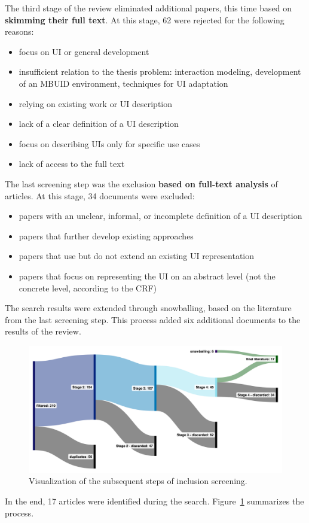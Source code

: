 The third stage of the review eliminated additional papers, this time based on \textbf{skimming their full text}.
At this stage, 62 were rejected for the following reasons:
\begin{itemize}
    \item focus on UI or general development
    \item insufficient relation to the thesis problem: interaction modeling, development of an MBUID environment, techniques for UI adaptation
    \item relying on existing work or UI description
    \item lack of a clear definition of a UI description
    \item focus on describing UIs only for specific use cases
    \item lack of access to the full text
\end{itemize}

The last screening step was the exclusion \textbf{based on full-text analysis} of articles.
At this stage, 34 documents were excluded:
\begin{itemize}
    \item papers with an unclear, informal, or incomplete definition of a UI description
    \item papers that further develop existing approaches
    \item papers that use but do not extend an existing UI representation
    \item papers that focus on representing the UI on an abstract level (not the concrete level, according to the CRF)
\end{itemize}

The search results were extended through snowballing, based on the literature from the last screening step.
This process added six additional documents to the results of the review.

\begin{figure}[tbh]
    \centering
    \includegraphics[width=\textwidth]{./2-literature-review/conducting-the-search}
    \caption{Visualization of the subsequent steps of inclusion screening.}
    \label{fig:conducting-the-search-vis}
\end{figure}

In the end, 17 articles were identified during the search.
Figure~\ref{fig:conducting-the-search-vis} summarizes the process.

